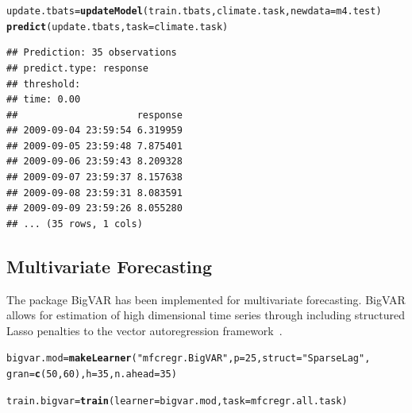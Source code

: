 \documentclass[12pt]{article}\usepackage[]{graphicx}\usepackage[]{color}
\makeatletter
\newcommand{\hlnum}[1]{\textcolor[rgb]{0.686,0.059,0.569}{#1}}%
\newcommand{\hlstr}[1]{\textcolor[rgb]{0.192,0.494,0.8}{#1}}%
\newcommand{\hlstd}[1]{\textcolor[rgb]{0.345,0.345,0.345}{#1}}%
\newcommand{\hlkwb}[1]{\textcolor[rgb]{0.69,0.353,0.396}{#1}}%
\newcommand{\hlkwc}[1]{\textcolor[rgb]{0.333,0.667,0.333}{#1}}%
\newcommand{\hlkwd}[1]{\textcolor[rgb]{0.737,0.353,0.396}{\textbf{#1}}}%
\newenvironment{kframe}{%
 \def\at@end@of@kframe{}%
 \ifinner\ifhmode%
  \def\at@end@of@kframe{\end{minipage}}%
  \begin{minipage}{\columnwidth}%
 \fi\fi%
 \def\FrameCommand##1{\hskip\@totalleftmargin \hskip-\fboxsep
 \colorbox{shadecolor}{##1}\hskip-\fboxsep
     \hskip-\linewidth \hskip-\@totalleftmargin \hskip\columnwidth}%
 \MakeFramed {\advance\hsize-\width
   \@totalleftmargin\z@ \linewidth\hsize
   \@setminipage}}%
 {\par\unskip\endMakeFramed%
 \at@end@of@kframe}
\newenvironment{knitrout}{}{} %
\theoremstyle{definition}
\newcommand{\pkg}[1]{{\fontseries{b}\selectfont #1}}
\makeatother
\begin{document}
\singlespacing
\begin{knitrout}
\color{fgcolor}\begin{kframe}
\begin{alltt}
\hlstd{update.tbats} \hlkwb{=} \hlkwd{updateModel}\hlstd{(train.tbats, climate.task,} \hlkwc{newdata} \hlstd{= m4.test)}
\hlkwd{predict}\hlstd{(update.tbats,} \hlkwc{task} \hlstd{= climate.task)}
\end{alltt}
\begin{verbatim}
## Prediction: 35 observations
## predict.type: response
## threshold: 
## time: 0.00
##                     response
## 2009-09-04 23:59:54 6.319959
## 2009-09-05 23:59:48 7.875401
## 2009-09-06 23:59:43 8.209328
## 2009-09-07 23:59:37 8.157638
## 2009-09-08 23:59:31 8.083591
## 2009-09-09 23:59:26 8.055280
## ... (35 rows, 1 cols)
\end{verbatim}
\end{kframe}
\end{knitrout}
\doublespacing

\subsection{Multivariate Forecasting}

The package \pkg{BigVAR} has been implemented for multivariate forecasting. \pkg{BigVAR} allows for estimation of high dimensional time series through including structured Lasso penalties to the vector autoregression framework~\cite{bigvarpaper}. 

\singlespacing
\begin{knitrout}
\color{fgcolor}\begin{kframe}
\begin{alltt}
\hlstd{bigvar.mod} \hlkwb{=} \hlkwd{makeLearner}\hlstd{(}\hlstr{"mfcregr.BigVAR"}\hlstd{,}\hlkwc{p} \hlstd{=} \hlnum{25}\hlstd{,} \hlkwc{struct} \hlstd{=} \hlstr{"SparseLag"}\hlstd{,}
                         \hlkwc{gran} \hlstd{=} \hlkwd{c}\hlstd{(}\hlnum{50}\hlstd{,} \hlnum{60}\hlstd{),}\hlkwc{h} \hlstd{=} \hlnum{35}\hlstd{,} \hlkwc{n.ahead} \hlstd{=} \hlnum{35}\hlstd{)}
\end{alltt}
\end{kframe}
\end{knitrout}


\begin{knitrout}
\color{fgcolor}\begin{kframe}
\begin{alltt}
\hlstd{train.bigvar} \hlkwb{=} \hlkwd{train}\hlstd{(}\hlkwc{learner} \hlstd{= bigvar.mod,} \hlkwc{task} \hlstd{= mfcregr.all.task )}
\end{alltt}
\end{kframe}
\end{knitrout}
\end{document}
